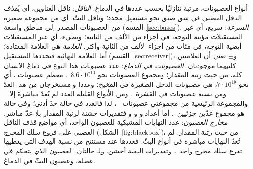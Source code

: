 \begin{table}[t]
\caption{أنواع العصبونات، مرتبة تنازليًا بحسب عددها في الدماغ. \emph{الناقل}: ناقل العناوين، أي يُقذف الناقل العصبي في شق ضيق نحو مستقبِل محدد؛ وناقل البثّ، أي من مجموعة صغيرة من العصبونات المصدر إلى مناطق واسعة (القسم~\ref{sec:buses}). \emph{السرعة}: سريع، أي عبر المستقبلات مؤينة التوجه، في أجزاء من الألف من الثانية؛ وبطيء، أي عبر المستقبلات أيضية التوجه، في مئات من أجزاء الألف من الثانية وأكثر. \emph{العلامة} هي العلامة المعتادة؛ أما العلامة النهائية فيحددها المستقبِل (القسم~\ref{sec:receiver})، و$\pm$ تعني أن العلامتين كلتيهما موجودتان. \emph{العصبونات في الدماغ}: عدد عصبونات هذا النوع في دماغ الإنسان كله، من حيث رتبة المقدار؛ ومجموع العصبونات نحو $8.6\cdot10^{10}$~\cite{Azevedo2009}. معظم عصبونات ، أي نحو $7\cdot10^{10}$، هي عصبونات الدخل الصغيرة في المخيخ؛ وعددا  و مستخرجان من هذا العدّ ومن نسبة عصبونات  في القشرة~\cite{Hendry1987}. ومن الأنواع القليلة العدد لم يُعدّ مباشرة إلا ~\cite{Airaksinen1991} والمجموعة الرئيسية من مجموعتي عصبونات ~\cite{Pakkenberg1991}، لذا فالعدد في حالة  حدّ أدنى؛ وفي حالة  هو مجموع عدّين جزئيين~\cite{Baker1990,Baker1991}. أما أعداد  و و و فتقديرات خشنة لرتبة المقدار بلا عدّ مباشر. \emph{مخارج العصبون}: عدد النهايات المشبكية للعصبون الواحد، أي مواضع قذف الناقل العصبي على فروع سلك المخرج (الشكل~\ref{fig:blackbox})، من حيث رتبة المقدار. لم تُعدّ النهايات مباشرة في أنواع البثّ: فعددها عند  مستنتج من نسبة الهدف التي يغطيها تفرع سلك مخرج واحد~\cite{Matsuda2009}، وتقديرات البقية أخشن. ولـ حالتان: العصبون الذي يتحكم في عضلة، وعصبون البثّ في الدماغ.}
\label{tab:types}
\end{table}

